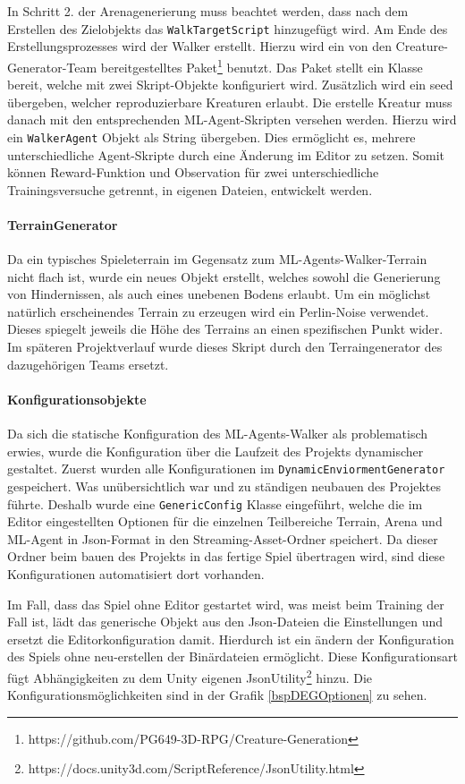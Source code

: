 In Schritt 2. der Arenagenerierung muss beachtet werden, dass nach dem Erstellen des Zielobjekts das \texttt{WalkTargetScript} hinzugefügt wird. Am Ende des Erstellungsprozesses wird der Walker erstellt. Hierzu wird ein von den Creature-Generator-Team bereitgestelltes Paket\footnote{https://github.com/PG649-3D-RPG/Creature-Generation} benutzt. Das Paket stellt ein Klasse bereit, welche mit zwei Skript-Objekte konfiguriert wird. Zusätzlich wird ein seed übergeben, welcher reproduzierbare Kreaturen erlaubt. Die erstelle Kreatur muss danach mit den entsprechenden ML-Agent-Skripten versehen werden. Hierzu wird ein \texttt{WalkerAgent} Objekt als String übergeben. Dies ermöglicht es, mehrere unterschiedliche Agent-Skripte durch eine Änderung im Editor zu setzen. Somit können Reward-Funktion und Observation für zwei unterschiedliche Trainingsversuche getrennt, in eigenen Dateien, entwickelt werden.

\paragraph{TerrainGenerator}
Da ein typisches Spieleterrain im Gegensatz zum ML-Agents-Walker-Terrain nicht flach ist, wurde ein neues Objekt erstellt, welches sowohl die Generierung von Hindernissen, als auch eines unebenen Bodens erlaubt. Um ein möglichst natürlich erscheinendes Terrain zu erzeugen wird ein Perlin-Noise verwendet. Dieses spiegelt jeweils die Höhe des Terrains an einen spezifischen Punkt wider. Im späteren Projektverlauf wurde dieses Skript durch den Terraingenerator des dazugehörigen Teams ersetzt.

\paragraph{Konfigurationsobjekte}
Da sich die statische Konfiguration des ML-Agents-Walker als problematisch erwies, wurde die Konfiguration über die Laufzeit des Projekts dynamischer gestaltet. Zuerst wurden alle Konfigurationen im \texttt{DynamicEnviormentGenerator} gespeichert. Was unübersichtlich war und zu ständigen neubauen des Projektes führte. Deshalb wurde eine \texttt{GenericConfig} Klasse eingeführt, welche die im Editor eingestellten Optionen für die einzelnen Teilbereiche Terrain, Arena und ML-Agent in Json-Format in den Streaming-Asset-Ordner speichert. Da dieser Ordner beim bauen des Projekts in das fertige Spiel übertragen wird, sind diese Konfigurationen automatisiert dort vorhanden. 

Im Fall, dass das Spiel ohne Editor gestartet wird, was meist beim Training der Fall ist, lädt das generische Objekt aus den Json-Dateien die Einstellungen und ersetzt die Editorkonfiguration damit. Hierdurch ist ein ändern der Konfiguration des Spiels ohne neu-erstellen der Binärdateien ermöglicht. Diese Konfigurationsart fügt Abhängigkeiten zu dem Unity eigenen JsonUtility\footnote{https://docs.unity3d.com/ScriptReference/JsonUtility.html} hinzu. Die Konfigurationsmöglichkeiten sind in der Grafik \ref{bspDEGOptionen} zu sehen.


